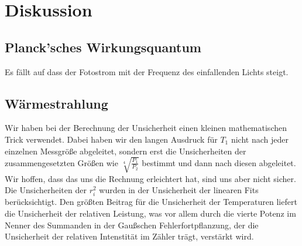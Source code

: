 \documentclass[12pt]{article}
\begin{document}
\section{Diskussion}
\subsection{Planck'sches Wirkungsquantum}
Es fällt auf dass der Fotostrom mit der Frequenz des einfallenden Lichts steigt.
\subsection{Wärmestrahlung}
Wir haben bei der Berechnung der Unsicherheit einen kleinen mathematischen Trick verwendet. Dabei haben wir den langen Ausdruck für $T_1$ nicht nach jeder einzelnen Messgröße abgeleitet, sondern erst die Unsicherheiten der zusammengesetzten Größen wie $\sqrt[4]{\frac{P_1}{P_2}}$ bestimmt und dann nach diesen abgeleitet. Wir hoffen, dass das uns die Rechnung erleichtert hat, sind uns aber nicht sicher. \\
Die Unsicherheiten der $r_i^2$ wurden in der Unsicherheit der linearen Fits berücksichtigt. Den größten Beitrag für die Unsicherheit der Temperaturen liefert die Unsicherheit der relativen Leistung, was vor allem durch die vierte Potenz im Nenner des Summanden in der Gaußschen Fehlerfortpflanzung, der die Unsicherheit der relativen Intenstität im Zähler trägt, verstärkt wird. \\
																							
\end{document}
